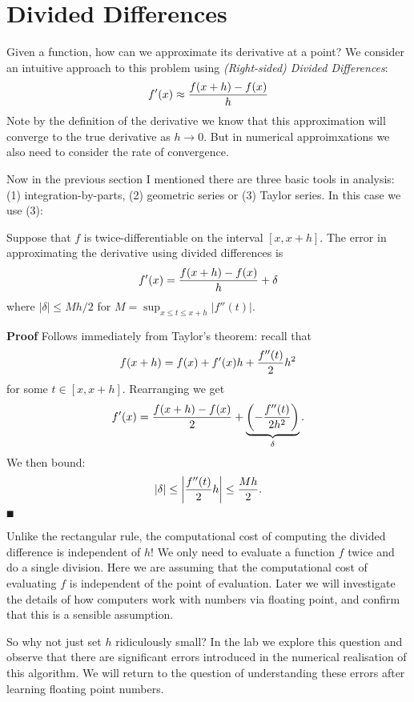 
\section{Divided Differences}
Given a function, how can we approximate its derivative at a point? We consider an intuitive approach to this problem using \emph{(Right-sided) Divided Differences}: 
\[
f'(x) \ensuremath{\approx} {f(x+h) - f(x) \over h}
\]
Note by the definition of the derivative we know that this approximation will converge to the true derivative as $h \ensuremath{\rightarrow} 0$. But in numerical approimxations we also need to consider the rate of convergence. 

Now in the previous section I mentioned there are three basic tools in analysis:  (1) integration-by-parts, (2) geometric series or (3) Taylor series. In this case we use (3):

\begin{proposition} Suppose that $f$ is twice-differentiable on the interval $[x,x+h]$. The error in approximating the derivative using divided differences is
\[
f'(x) = {f(x+h) - f(x) \over h} + \ensuremath{\delta}
\]
where $|\ensuremath{\delta}| \ensuremath{\leq} Mh/2$ for  $M = \sup_{x \ensuremath{\leq} t \ensuremath{\leq} x+h} |f''(t)|$.

\end{proposition}
\textbf{Proof} Follows immediately from Taylor's theorem: recall that
\[
f(x+h) = f(x) + f'(x) h + {f''(t) \over 2} h^2
\]
for some $t \ensuremath{\in} [x,x+h]$. Rearranging we get
\[
f'(x) = {f(x+h) - f(x) \over 2} + \underbrace{\left(-{f''(t)\over 2 h^2} \right)}_\ensuremath{\delta}.
\]
We then bound:
\[
|\delta| \leq \left|{{f''(t) \over 2} h}\right| \leq {M  h \over 2}.
\]
\ensuremath{\QED}

Unlike the rectangular rule, the computational cost of computing the divided difference is independent of $h$! We only need to evaluate a function $f$ twice and do a single division. Here we are assuming that the computational cost of evaluating $f$ is independent of the point of evaluation. Later we will investigate the details of how computers work with numbers via floating point,  and confirm that this is a sensible assumption.

So why not just set $h$ ridiculously small? In the lab we explore this question and observe that there are significant errors introduced in the numerical realisation of this algorithm. We will return to the question of understanding these errors after learning floating point numbers. 

